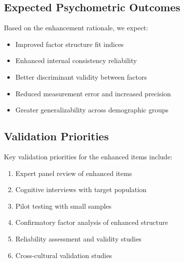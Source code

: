 \documentclass[12pt,a4paper]{article}
\begin{document}
\subsection*{Expected Psychometric Outcomes}

Based on the enhancement rationale, we expect:

\begin{itemize}
\item Improved factor structure fit indices
\item Enhanced internal consistency reliability
\item Better discriminant validity between factors
\item Reduced measurement error and increased precision
\item Greater generalizability across demographic groups
\end{itemize}

\subsection*{Validation Priorities}

Key validation priorities for the enhanced items include:

\begin{enumerate}
\item Expert panel review of enhanced items
\item Cognitive interviews with target population
\item Pilot testing with small samples
\item Confirmatory factor analysis of enhanced structure
\item Reliability assessment and validity studies
\item Cross-cultural validation studies
\end{enumerate}
\end{document}
